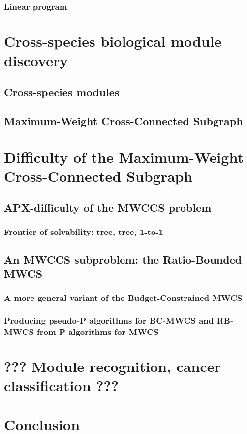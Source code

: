 \documentclass[draft]{memoir}
\begin{document}
  \subsection{Linear program}

\chapter{Cross-species biological module discovery}
 \section{Cross-species modules}
 \section{Maximum-Weight Cross-Connected Subgraph}

\chapter{Difficulty of the Maximum-Weight Cross-Connected Subgraph}

 \section{APX-difficulty of the MWCCS problem}
  \subsection{Frontier of solvability: tree, tree, 1-to-1}

 \section{An MWCCS subproblem: the Ratio-Bounded MWCS}
  \subsection{A more general variant of the Budget-Constrained MWCS}
  \subsection{Producing pseudo-P algorithms for BC-MWCS and RB-MWCS from P algorithms for MWCS}

\chapter{??? Module recognition, cancer classification ???}

\chapter{Conclusion}
\end{document}
